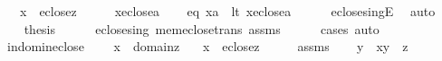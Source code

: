 \begin{isabellebody}
\ \ \ {\isachardoublequoteopen}x\ {\isasymin}\ eclose{\isacharparenleft}{\kern0pt}{\isacharbraceleft}{\kern0pt}z{\isacharbraceright}{\kern0pt}{\isacharparenright}{\kern0pt}{\isachardoublequoteclose}\isanewline
%
\isadelimproof
%
\endisadelimproof
%
\isatagproof
{}\isamarkupfalse%
\ {\isacharminus}{\kern0pt}\isanewline
\ \ \isamarkupfalse%
\ {\isacartoucheopen}x{\isasymin}eclose{\isacharparenleft}{\kern0pt}{\isacharbraceleft}{\kern0pt}a{\isacharbraceright}{\kern0pt}{\isacharparenright}{\kern0pt}{\isacartoucheclose}\isanewline
\ \ \isamarkupfalse%
\ {\isacharparenleft}{\kern0pt}eq{\isacharparenright}{\kern0pt}\ {\isachardoublequoteopen}x{\isacharequal}{\kern0pt}a{\isachardoublequoteclose}\ {\isacharbar}{\kern0pt}\ {\isacharparenleft}{\kern0pt}lt{\isacharparenright}{\kern0pt}\ {\isachardoublequoteopen}x{\isasymin}eclose{\isacharparenleft}{\kern0pt}a{\isacharparenright}{\kern0pt}{\isachardoublequoteclose}\isanewline
\ \ \ \ \isamarkupfalse%
\ eclose{\isacharunderscore}{\kern0pt}singE\ \isamarkupfalse%
\ auto\isanewline
\ \ \isamarkupfalse%
\isanewline
\ \ \isamarkupfalse%
\ {\isacharquery}{\kern0pt}thesis\isanewline
\ \ \ \ \isamarkupfalse%
\ eclose{\isacharunderscore}{\kern0pt}sing\ mem{\isacharunderscore}{\kern0pt}eclose{\isacharunderscore}{\kern0pt}trans\ assms\isanewline
\ \ \ \ \isamarkupfalse%
\ {\isacharparenleft}{\kern0pt}cases{\isacharcomma}{\kern0pt}\ auto{\isacharparenright}{\kern0pt}\isanewline
{}\isamarkupfalse%
%
\endisatagproof
{\isafoldproof}%
%
\isadelimproof
\isanewline
%
\endisadelimproof
\isanewline
{}\isamarkupfalse%
\ in{\isacharunderscore}{\kern0pt}dom{\isacharunderscore}{\kern0pt}in{\isacharunderscore}{\kern0pt}eclose\ {\isacharcolon}{\kern0pt}\isanewline
\ \ \ {\isachardoublequoteopen}x\ {\isasymin}\ domain{\isacharparenleft}{\kern0pt}z{\isacharparenright}{\kern0pt}{\isachardoublequoteclose}\isanewline
\ \ \ {\isachardoublequoteopen}x\ {\isasymin}\ eclose{\isacharparenleft}{\kern0pt}z{\isacharparenright}{\kern0pt}{\isachardoublequoteclose}\isanewline
%
\isadelimproof
%
\endisadelimproof
%
\isatagproof
{}\isamarkupfalse%
\ {\isacharminus}{\kern0pt}\isanewline
\ \ \isamarkupfalse%
\ assms\isanewline
\ \ \isamarkupfalse%
\ y\ \ {\isachardoublequoteopen}{\isasymlangle}x{\isacharcomma}{\kern0pt}y{\isasymrangle}\ {\isasymin}\ z{\isachardoublequoteclose}\isanewline

\end{isabellebody}
